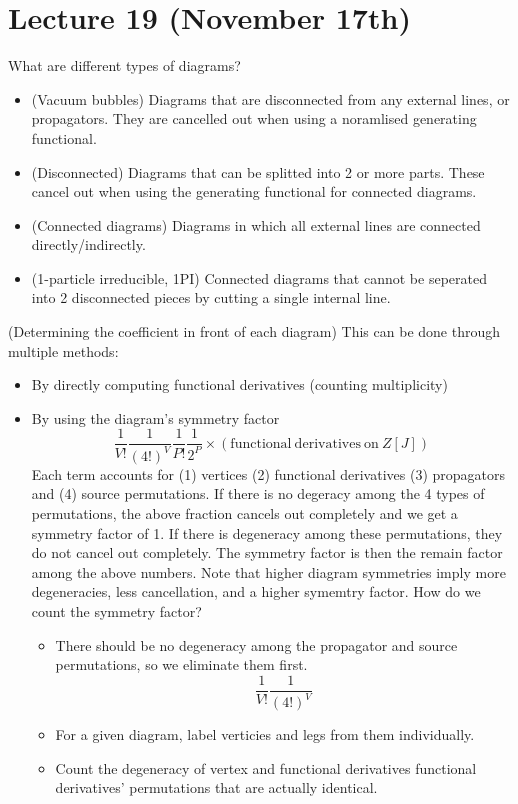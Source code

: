 \section{Lecture 19 (November 17th)}
\begin{rmk}
What are different types of diagrams? 
\begin{itemize}
\item[(i)] (Vacuum bubbles) Diagrams that are disconnected from any external lines, or propagators. They are cancelled out when using a noramlised generating functional.
\item[(ii)] (Disconnected) Diagrams that can be splitted into 2 or more parts. These cancel out when using the generating functional for connected diagrams. 
\item[(iii)] (Connected diagrams) Diagrams in which all external lines are connected directly/indirectly. 
\item[(iv)] (1-particle irreducible, 1PI) Connected diagrams that cannot be seperated into 2 disconnected pieces by cutting a single internal line. 
\end{itemize}
\end{rmk}
\vspace{2ex}
\begin{thm}
(Determining the coefficient in front of each diagram) This can be done through multiple methods:
\begin{itemize}
\item[(i)] By directly computing functional derivatives (counting multiplicity) 
\item[(ii)] By using the diagram's symmetry factor 
\[\dfrac{1}{V!}\dfrac{1}{(4!)^{V}}\dfrac{1}{P!}\dfrac{1}{2^{P}}\times (\mathrm{functional\ derivatives\ on\ }Z[J])\]
Each term accounts for (1) vertices (2) functional derivatives (3) propagators and (4) source permutations. If there is no degeracy among the 4 types of permutations, the above fraction cancels out completely and we get a symmetry factor of 1. If there is degeneracy among these permutations, they do not cancel out completely. The symmetry factor is then the remain factor among the above numbers. Note that higher diagram symmetries imply more degeneracies, less cancellation, and a higher symemtry factor. How do we count the symmetry factor? 
\begin{itemize}
\item[(I)] There should be no degeneracy among the propagator and source permutations, so we eliminate them first.
\[\dfrac{1}{V!}\dfrac{1}{(4!)^{V}}\]
\item[(II)] For a given diagram, label verticies and legs from them individually.
\item[(III)] Count the degeneracy of vertex and functional derivatives functional derivatives' permutations that are actually identical.
\end{itemize}
\end{itemize}
\end{thm}
